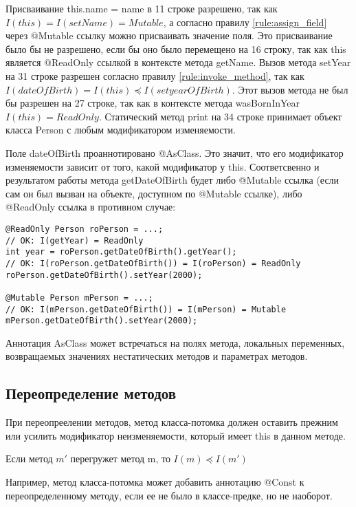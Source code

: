 Присваивание this.name = name в 11 строке разрешено, так как $I(this) = I(setName) = Mutable$, а согласно правилу \ref{rule:assign_field} через @Mutable ссылку можно присваивать значение поля. Это присваивание было бы не разрешено, если бы оно было перемещено  на 16 строку, так как this является @ReadOnly ссылкой в контексте метода getName. Вызов метода setYear на 31 строке разрешен согласно правилу \ref{rule:invoke_method}, так как $I(dateOfBirth) = I(this) \preceq I(setyearOfBirth)$. Этот вызов метода не был бы разрешен на 27 строке, так как в контексте метода wasBornInYear $I(this) = ReadOnly$. Статический метод print на 34 строке принимает объект класса Person с любым модификатором изменяемости. 

Поле dateOfBirth проаннотировано @AsClass. Это значит, что его модификатор изменяемости зависит от того, какой модификатор у this. Соответсвенно и результатом работы метода getDateOfBirth будет либо @Mutable ссылка (если сам он был вызван на объекте, доступном по @Mutable ссылке), либо @ReadOnly ссылка в противном случае:

\begin{lstlisting}[caption=Использование аннотации AsClass, label=code:as_class]
@ReadOnly Person roPerson = ...;
// OK: I(getYear) = ReadOnly
int year = roPerson.getDateOfBirth().getYear(); 
// OK: I(roPerson.getDateOfBirth()) = I(roPerson) = ReadOnly
roPerson.getDateOfBirth().setYear(2000); 
	
@Mutable Person mPerson = ...;
// OK: I(mPerson.getDateOfBirth()) = I(mPerson) = Mutable
mPerson.getDateOfBirth().setYear(2000); 
\end{lstlisting} 

Аннотация AsClass может встречаться на полях метода, локальных переменных, возвращаемых значениях нестатических методов и параметрах методов.

\subsection{Переопределение методов}

При переопреелении методов, метод класса-потомка должен оставить прежним или усилить модификатор неизменяемости, который имеет this в данном методе. 

\begin{Rule}\label{rule:override_method}
Если метод $m'$ перегружет метод m, то $I(m) \preceq I(m')$
\end{Rule}

Например, метод класса-потомка может добавить аннотацию @Const к переопределенному методу, если ее не было в классе-предке, но не наоборот. 

